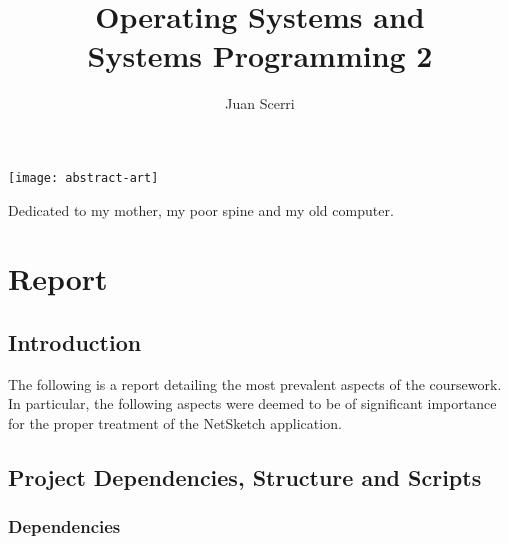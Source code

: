 \documentclass[article]{uom-coursework}
\title{Operating Systems and \\ Systems Programming 2}
\author{Juan Scerri}
\makeatletter
\newcommand{\RemoveAlgoNumber}{\renewcommand{\fnum@algocf}{\AlCapSty{\AlCapFnt\algorithmcfname}}}
\makeatother
\begin{document}
\RemoveAlgoNumber


\pagestyle{umpage}

\frontmatter

\maketitle %

\clearpage

\thispagestyle{empty}
\vspace*{9em}
\begin{center}
\texttt{[image: abstract-art]}
\end{center}

\vspace*{2em}
\begin{center}
    Dedicated to my mother, my poor spine and my old computer.
\end{center}

\clearpage

\tableofcontents %

\clearpage

\mainmatter

\chapter*{Report}
\label{chap:report}

\raggedright

\section{Introduction}

The following is a report detailing the most prevalent aspects
of the coursework. In particular, the following aspects were
deemed to be of significant importance for the proper treatment
of the NetSketch application.

\section{Project Dependencies, Structure and Scripts}

\subsection{Dependencies}
\end{document}
